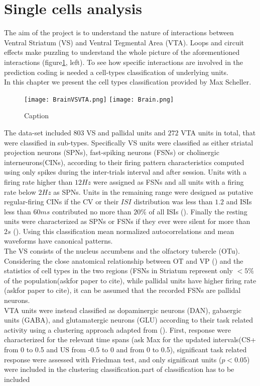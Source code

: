 
\section{Single cells analysis}
\label{chap:UnitsAnalysis}
The aim of the project is to understand the nature of interactions between Ventral Striatum (VS) and Ventral Tegmental Area (VTA). Loops and circuit effects make puzzling to understand the whole picture of the aforementioned interactions (figure\ref{fig:Brain}, left). To see how specific interactions are involved in the prediction coding is needed a cell-types classification of underlying units.\\
In this chapter we present the cell types classification provided by Max Scheller.
\begin{figure}
    \centering
    \texttt{[image: BrainVSVTA.png]}
    \texttt{[image: Brain.png]}
    \caption{Caption}
    \label{fig:Brain}
\end{figure}
The data-set included $803$ VS and pallidal units and $272$ VTA units in total, that were classified in sub-types. Specifically VS units were classified as either striatal projection neurons (SPNs), fast-spiking neurons (FSNs) or cholinergic interneurons(CINs), according to their firing pattern characteristics computed using only spikes during the inter-trials interval and after session. Units with a firing rate higher than $12 Hz$ were assigned as FSNs and all units with a firing rate below $2 Hz$ as SPNs. Units in the remaining range were designed as putative regular-firing CINs if the CV or their $ISI$ distribution was less than $1.2$ and ISIs less than $60 ms$ contributed no more than $20\%$ of all ISIs (\cite{Inokawa}). Finally the resting units were characterized as SPNs or FSNs if they ever were silent for more than $2 s$ (\cite{Graybiel}). Using this classification mean normalized autocorrelations and mean waveforms have canonical patterns.\\ The VS consists of the nucleus accumbens and the olfactory tubercle (OTu).
Considering the close anatomical relationship between OT and VP (\cite{Heimer1982}) and the statistics of cell types in the two regions (FSNs in Striatum represent only $<5\%$ of the population({\color{red}askfor paper to cite}), while pallidal units have higher firing rate ({\color{red}askfor paper to cite}), it can be assumed that the recorded FSNs are pallidal neurons.\\
VTA units were instead classified as dopaminergic neurons (DAN), gabaergic units (GABA), and glutamatergic neurons (GLU) according to their task related activity using a clustering approach adapted from (\cite{Uchida}). First, response were characterized for the relevant time spans ({\color{red}ask Max for the updated intervals}(CS+ from 0 to 0.5 and US from -0.5 to 0 and from 0 to 0.5), significant task related response were assessed with Friedman test, and only significant units ($p<0.05$) were included in the clustering classification.{\color{red}part of classification has to be included}
